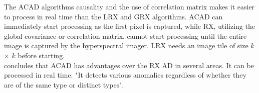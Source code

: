  The ACAD algorithms causality and the use of correlation matrix makes it easier to process in real time than the LRX and GRX algorithms. ACAD can immediately start processing as the first pixel is captured, while RX, utilizing the global covariance or correlation matrix, cannot start processing until the entire image is captured by the hyperspectral imager. LRX needs an image tile of size $k$ $\times$ $k$ before starting.\\
 
 \cite{chang2006characterization} concludes that ACAD has advantages over the RX AD in several areas. It can be processed in real time. "It detects various anomalies regardless of whether they are of the same type or distinct types"\cite{chang2006characterization}. 
 
 
 
 
 
